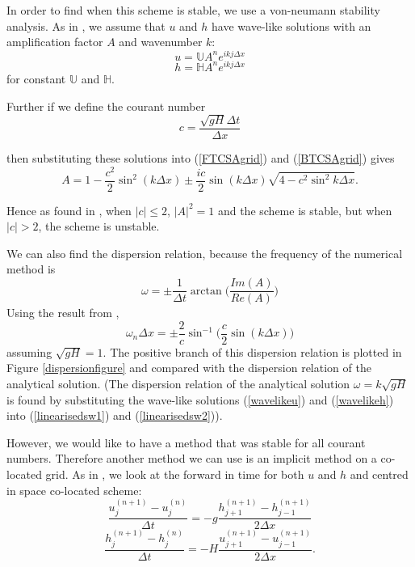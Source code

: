 \documentclass[a4paper,12pt, notitlepage]{article}
\begin{document}
In order to find when this scheme is stable, we use a von-neumann stability analysis. As in \cite{MPE textbook}, we assume that $u$ and $h$ have wave-like solutions with an amplification factor $A$ and wavenumber $k$:
\begin{equation} \label{wavelikeu}
u  =  \mathbb{U}  A^{n} e^{ikj\Delta x}
\end{equation}
\begin{equation} \label{wavelikeh}
h  =  \mathbb{H} A^{n} e^{ikj\Delta x}
\end{equation}
for constant $\mathbb{U}$ and $\mathbb{H}$.

Further if we define the courant number 
\begin{equation}\label{courantnumber}
c = \frac{\sqrt{gH}\Delta t}{\Delta x}
\end{equation}

then substituting these solutions into (\ref{FTCSAgrid}) and (\ref{BTCSAgrid}) gives
\begin{equation}
A = 1 - \frac{c^{2}}{2} \sin^{2}(k\Delta x) \pm \frac{ic}{2}\sin(k\Delta x)\sqrt{4 - c^{2}\sin^{2}k\Delta x}.
\end{equation} 
 
Hence as found in \cite{MPE textbook}, when $\lvert c \rvert \leq 2$, $\lvert A \rvert^{2} = 1$ and the scheme is stable, but when $\lvert c \rvert > 2$, the scheme is unstable.
 
We can also find the dispersion relation, because the frequency of the numerical method is 
\begin{equation} \label{frequency}
\omega = \pm \frac{1}{\Delta t} \arctan\bigg(\frac{Im(A)}{Re(A)}\bigg)
\end{equation}
Using the result from \cite{MPE textbook}, 
\begin{equation}
\omega_{n}\Delta x = \pm \frac{2}{c} \sin^{-1} \bigg(\frac{c}{2}\sin(k\Delta x)\bigg)
\end{equation}
assuming $\sqrt{gH} = 1$. The positive branch of this dispersion relation is plotted in Figure \ref{dispersionfigure} and compared with the dispersion relation of the analytical solution. (The dispersion relation of the analytical solution $\omega = k\sqrt{gH}$ is found by substituting the wave-like solutions (\ref{wavelikeu}) and (\ref{wavelikeh}) into (\ref{linearisedsw1}) and (\ref{linearisedsw2})).


However, we would like to have a method that was stable for all courant numbers. Therefore another method we can use is an implicit method on a co-located grid. As in \cite{MPE textbook}, we look at the forward in time for both $u$ and $h$ and centred in space co-located scheme:
\begin{equation} \label{FTimplicitAgrid1}
\frac{u_{j}^{(n+1)} - u_{j}^{(n)}}{\Delta t} = -g \frac{h_{j+1}^{(n+1)} - h_{j-1}^{(n+1)}}{2\Delta x}
\end{equation}
\begin{equation}\label{FTimplicitAgrid2}
\frac{h_{j}^{(n+1)} - h_{j}^{(n)}}{\Delta t} = -H \frac{u_{j+1}^{(n+1)} - u_{j-1}^{(n+1)}}{2\Delta x}.
\end{equation}
\end{document}
